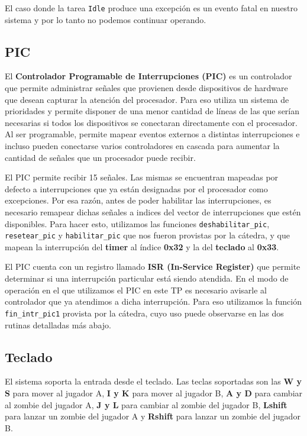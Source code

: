 \documentclass[a4paper]{article}
\begin{document}
El caso donde la tarea \texttt{Idle} produce una excepción es un evento fatal en nuestro sistema y por lo tanto no podemos continuar operando.


\subsection{PIC}
El \textbf{Controlador Programable de Interrupciones (PIC)} es un controlador que permite administrar señales que provienen desde dispositivos de hardware que desean capturar la atención del procesador. Para eso utiliza un sistema de prioridades y permite disponer de una menor cantidad de líneas de las que serían necesarias si todos los dispositivos se conectaran directamente con el procesador. Al ser programable, permite mapear eventos externos a distintas interrupciones e incluso pueden conectarse varios controladores en cascada para aumentar la cantidad de señales que un procesador puede recibir.

El PIC permite recibir 15 señales. Las mismas se encuentran mapeadas por defecto a interrupciones que ya están designadas por el procesador como excepciones. Por esa razón, antes de poder habilitar las interrupciones, es necesario remapear dichas señales a indices del vector de interrupciones que estén disponibles. Para hacer esto, utilizamos las funciones \texttt{deshabilitar_pic}, \texttt{resetear_pic} y \texttt{habilitar_pic} que nos fueron provistas por la cátedra, y que mapean la interrupción del \textbf{timer} al índice \textbf{0x32} y la del \textbf{teclado} al \textbf{0x33}.

El PIC cuenta con un registro llamado \textbf{ISR (In-Service Register)} que permite determinar si una interrupción particular está siendo atendida. En el modo de operación en el que utilizamos el PIC en este TP es necesario avisarle al controlador que ya atendimos a dicha interrupción. Para eso utilizamos la función \texttt{fin_intr_pic1} provista por la cátedra, cuyo uso puede observarse en las dos rutinas detalladas más abajo.

\subsection{Teclado}
El sistema soporta la entrada desde el teclado. Las teclas soportadas son las \textbf{W y S} para mover al jugador A, \textbf{I y K} para mover al jugador B, \textbf{A y D} para cambiar al zombie del jugador A, \textbf{J y L} para cambiar al zombie del jugador B, \textbf{Lshift} para lanzar un zombie del jugador A y \textbf{Rshift} para lanzar un zombie del jugador B.
 
\end{document}
